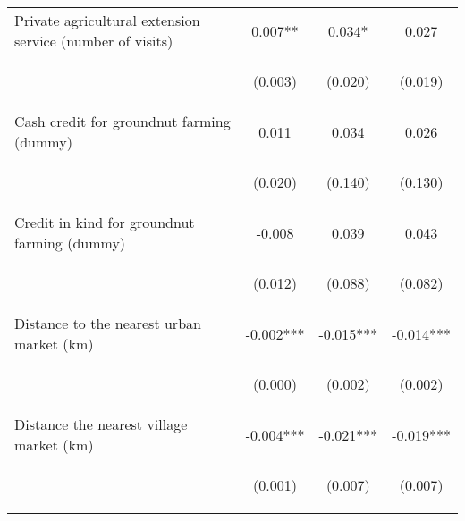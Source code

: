 \begin{center}
\begin{tabular}{lccc}
Private agricultural extension service (number of visits) & 0.007** & 0.034* & 0.027 \\
\vspace{4pt} & \begin{footnotesize}(0.003)\end{footnotesize} & \begin{footnotesize}(0.020)\end{footnotesize} & \begin{footnotesize}(0.019)\end{footnotesize} \\
Cash credit for groundnut farming (dummy) & 0.011 & 0.034 & 0.026 \\
\vspace{4pt} & \begin{footnotesize}(0.020)\end{footnotesize} & \begin{footnotesize}(0.140)\end{footnotesize} & \begin{footnotesize}(0.130)\end{footnotesize} \\
Credit in kind for groundnut farming (dummy) & -0.008 & 0.039 & 0.043 \\
\vspace{4pt} & \begin{footnotesize}(0.012)\end{footnotesize} & \begin{footnotesize}(0.088)\end{footnotesize} & \begin{footnotesize}(0.082)\end{footnotesize} \\
Distance to the nearest urban market (km) & -0.002*** & -0.015*** & -0.014*** \\
\vspace{4pt} & \begin{footnotesize}(0.000)\end{footnotesize} & \begin{footnotesize}(0.002)\end{footnotesize} & \begin{footnotesize}(0.002)\end{footnotesize} \\
Distance the nearest village market (km) & -0.004*** & -0.021*** & -0.019*** \\
\vspace{4pt} & \begin{footnotesize}(0.001)\end{footnotesize} & \begin{footnotesize}(0.007)\end{footnotesize} & \begin{footnotesize}(0.007)\end{footnotesize} \\

\end{tabular}
\end{center}
